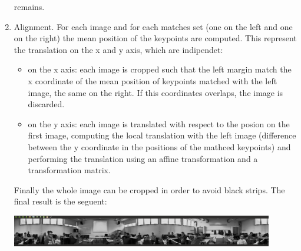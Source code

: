 \documentclass[11pt, a4paper]{toptesi}
\begin{document}
\begin{enumerate}
         remains.
    \item Alignment. For each image and for each matches set (one on the left
        and one on the right) the mean position of the keypoints are computed.
        This represent the translation on the x and y axis, which are
        indipendet:
        \begin{itemize}
            \item on the x axis: each image is cropped such that the left margin
                match the x coordinate of the mean position of keypoints matched
                with the left image, the same on the right. If this coordinates
                overlaps, the image is discarded.
            \item on the y axis: each image is translated with respect to the
                posion on the first image, computing the local translation with
                the left image (difference between the y coordinate in the
                positions of the mathced keypoints) and performing the
                translation using an affine transformation and a transformation
                matrix.
        \end{itemize}
        Finally the whole image can be cropped in order to avoid black strips.
        The final result is the seguent:
         \begin{center}
             \includegraphics[width=0.9\textwidth]{panoramic.png}
         \end{center}


\end{enumerate}       
\end{document}
